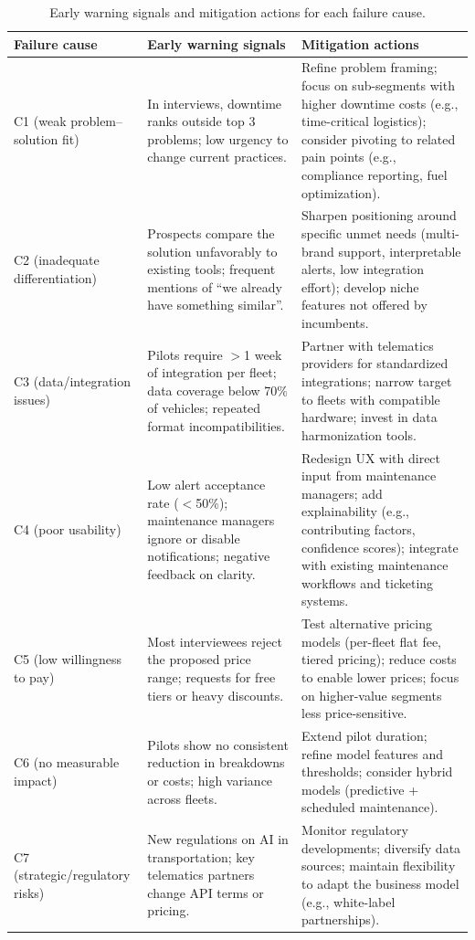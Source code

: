 \documentclass[11pt,a4paper]{article}
\begin{document}
\begin{table}[H]
\centering
\small
\begin{tabularx}{\linewidth}{l X X}
\toprule
\textbf{Failure cause} & \textbf{Early warning signals} & \textbf{Mitigation actions} \\
\midrule

C1 (weak problem--solution fit) &
In interviews, downtime ranks outside top 3 problems; low urgency to change current practices. &
Refine problem framing; focus on sub-segments with higher downtime costs (e.g., time-critical logistics); consider pivoting to related pain points (e.g., compliance reporting, fuel optimization). \\

C2 (inadequate differentiation) &
Prospects compare the solution unfavorably to existing tools; frequent mentions of ``we already have something similar''. &
Sharpen positioning around specific unmet needs (multi-brand support, interpretable alerts, low integration effort); develop niche features not offered by incumbents. \\

C3 (data/integration issues) &
Pilots require $>$1 week of integration per fleet; data coverage below 70\% of vehicles; repeated format incompatibilities. &
Partner with telematics providers for standardized integrations; narrow target to fleets with compatible hardware; invest in data harmonization tools. \\

C4 (poor usability) &
Low alert acceptance rate ($<$50\%); maintenance managers ignore or disable notifications; negative feedback on clarity. &
Redesign UX with direct input from maintenance managers; add explainability (e.g., contributing factors, confidence scores); integrate with existing maintenance workflows and ticketing systems. \\

C5 (low willingness to pay) &
Most interviewees reject the proposed price range; requests for free tiers or heavy discounts. &
Test alternative pricing models (per-fleet flat fee, tiered pricing); reduce costs to enable lower prices; focus on higher-value segments less price-sensitive. \\

C6 (no measurable impact) &
Pilots show no consistent reduction in breakdowns or costs; high variance across fleets. &
Extend pilot duration; refine model features and thresholds; consider hybrid models (predictive + scheduled maintenance). \\

C7 (strategic/regulatory risks) &
New regulations on AI in transportation; key telematics partners change API terms or pricing. &
Monitor regulatory developments; diversify data sources; maintain flexibility to adapt the business model (e.g., white-label partnerships). \\

\bottomrule
\end{tabularx}
\caption{Early warning signals and mitigation actions for each failure cause.}
\label{tab:failure-mitigation}
\end{table}
\end{document}
